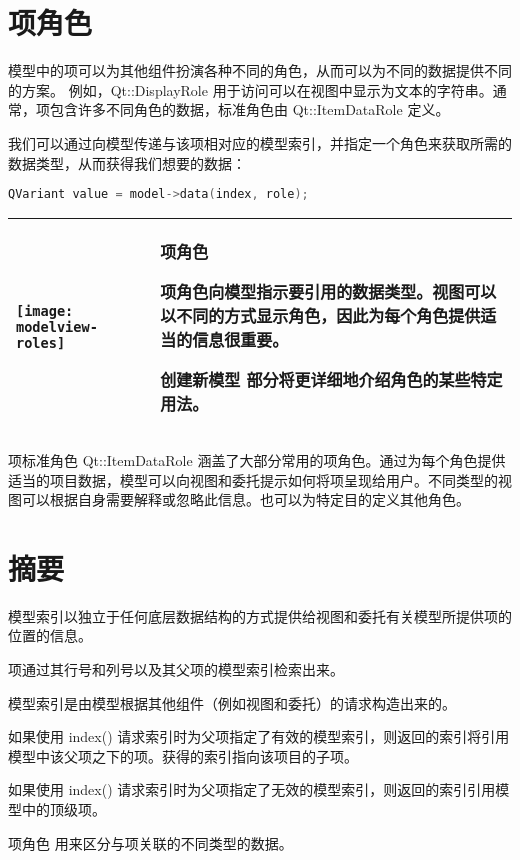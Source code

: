 \section{项角色}

模型中的项可以为其他组件扮演各种不同的角色，从而可以为不同的数据提供不同的方案。 例如，Qt::DisplayRole 用于访问可以在视图中显示为文本的字符串。通常，项包含许多不同角色的数据，标准角色由 Qt::ItemDataRole 定义。

我们可以通过向模型传递与该项相对应的模型索引，并指定一个角色来获取所需的数据类型，从而获得我们想要的数据：

\begin{lstlisting}[language=C++]
QVariant value = model->data(index, role);
\end{lstlisting}


\begin{tabular}{|l|m{25em}|}
\hline
    \texttt{[image: modelview-roles]}
  & 
项角色

项角色向模型指示要引用的数据类型。视图可以以不同的方式显示角色，因此为每个角色提供适当的信息很重要。

创建新模型 部分将更详细地介绍角色的某些特定用法。\\
\hline	
\end{tabular}


项标准角色 Qt::ItemDataRole 涵盖了大部分常用的项角色。通过为每个角色提供适当的项目数据，模型可以向视图和委托提示如何将项呈现给用户。不同类型的视图可以根据自身需要解释或忽略此信息。也可以为特定目的定义其他角色。

\section{摘要}

\begin{compactitem}
\item 模型索引以独立于任何底层数据结构的方式提供给视图和委托有关模型所提供项的位置的信息。
\item 项通过其行号和列号以及其父项的模型索引检索出来。
\item 模型索引是由模型根据其他组件（例如视图和委托）的请求构造出来的。
\item 如果使用 index() 请求索引时为父项指定了有效的模型索引，则返回的索引将引用模型中该父项之下的项。获得的索引指向该项目的子项。
\item 如果使用 index() 请求索引时为父项指定了无效的模型索引，则返回的索引引用模型中的顶级项。
\item 项角色 用来区分与项关联的不同类型的数据。
\end{compactitem}

